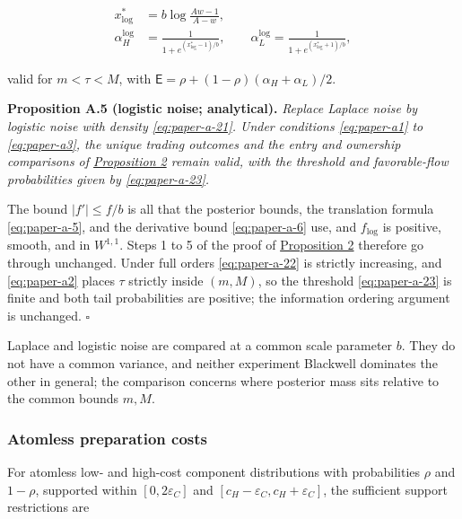 \documentclass[
  12pt,
]{article}
\begin{document}
\[
\begin{aligned}
x^*_{\mathrm{log}}&=b\log\frac{Aw-1}{A-w},\\
\alpha_H^{\mathrm{log}}&=\frac1{1+e^{(x^*_{\mathrm{log}}-1)/b}},\qquad
\alpha_L^{\mathrm{log}}=\frac1{1+e^{(x^*_{\mathrm{log}}+1)/b}},
\end{aligned}
\tag{A.23}\label{eq:paper-a-23}
\]

valid for \(m<\tau<M\), with
\(\mathsf E=\rho+(1-\rho)(\alpha_H+\alpha_L)/2\).


\protect{}\label{result-proposition-a-5}{\textbf{Proposition
A.5 (logistic noise; analytical).}} \emph{Replace Laplace noise by
logistic noise with density \eqref{eq:paper-a-21}. Under conditions
\eqref{eq:paper-a1} to \eqref{eq:paper-a3}, the unique trading outcomes
and the entry and ownership comparisons of
\hyperref[result-proposition-2]{Proposition 2} remain valid, with the
threshold and favorable-flow probabilities given by
\eqref{eq:paper-a-23}.}

The bound \(|f'|\le f/b\) is all that the posterior bounds, the
translation formula \eqref{eq:paper-a-5}, and the derivative bound
\eqref{eq:paper-a-6} use, and \(f_{\mathrm{log}}\) is positive, smooth,
and in \(W^{1,1}\). Steps 1 to 5 of the proof of
\hyperref[result-proposition-2]{Proposition 2} therefore go through
unchanged. Under full orders \eqref{eq:paper-a-22} is strictly
increasing, and \eqref{eq:paper-a2} places \(\tau\) strictly inside
\((m,M)\), so the threshold \eqref{eq:paper-a-23} is finite and both
tail probabilities are positive; the information ordering argument is
unchanged. \(\square\)

Laplace and logistic noise are compared at a common scale parameter
\(b\). They do not have a common variance, and neither experiment
Blackwell dominates the other in general; the comparison concerns where
posterior mass sits relative to the common bounds \(m,M\).

\subsubsection{Atomless preparation
costs}\label{atomless-preparation-costs}

For atomless low- and high-cost component distributions with
probabilities \(\rho\) and \(1-\rho\), supported within
\([0,2\varepsilon_C]\) and \([c_H-\varepsilon_C,c_H+\varepsilon_C]\),
the sufficient support restrictions are
\end{document}
